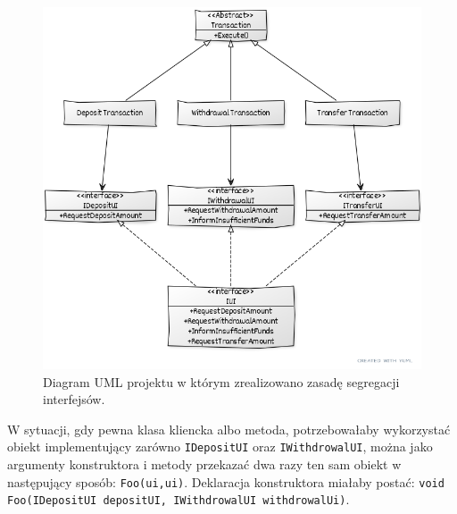 \begin{figure}[hbt!]
	\centering
	\includegraphics[width=0.8\linewidth]{images/SolidIspUml}
	\caption{Diagram UML projektu w którym zrealizowano zasadę segregacji interfejsów.}
	\label{lab1/fig/SolidIspUml}
\end{figure}
%
%
%
%
%
%

W sytuacji, gdy pewna klasa kliencka albo metoda, potrzebowałaby wykorzystać obiekt implementujący zarówno \texttt{IDepositUI} oraz \texttt{IWithdrowalUI}, można jako argumenty konstruktora i metody przekazać dwa razy ten sam obiekt w następujący sposób: \texttt{Foo(ui,ui)}. Deklaracja konstruktora miałaby postać: \texttt{void Foo(IDepositUI depositUI, IWithdrowalUI withdrowalUi)}.

